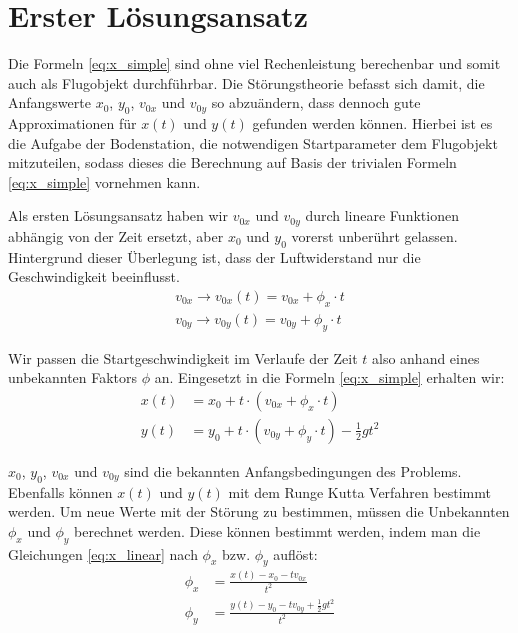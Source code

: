 \section{Erster Lösungsansatz
\label{perturbation:section:ersterloesungsansatz}}

Die Formeln \eqref{eq:x_simple} sind ohne viel Rechenleistung berechenbar und somit auch als Flugobjekt durchführbar. Die Störungstheorie befasst sich damit, die Anfangswerte $x_0$, $y_0$, $v_{0x}$ und $v_{0y}$ so abzuändern, dass dennoch gute Approximationen für $x(t)$ und $y(t)$ gefunden werden können. Hierbei ist es die Aufgabe der Bodenstation, die notwendigen Startparameter dem Flugobjekt mitzuteilen, sodass dieses die Berechnung auf Basis der trivialen Formeln \ref{eq:x_simple}  vornehmen kann.

Als ersten Lösungsansatz haben wir $v_{0x}$ und $v_{0y}$ durch lineare Funktionen abhängig von der Zeit ersetzt, aber $x_0$ und $y_0$ vorerst unberührt gelassen. Hintergrund dieser Überlegung ist, dass der Luftwiderstand nur die Geschwindigkeit beeinflusst.
\begin{equation*}
	\begin{aligned}
		v_{0x} \rightarrow v_{0x}(t) = v_{0x} + \phi_x \cdot t\\
		v_{0y} \rightarrow v_{0y}(t) = v_{0y} + \phi_y \cdot t
	\end{aligned}
\end{equation*}



Wir passen die Startgeschwindigkeit im Verlaufe der Zeit $t$ also anhand eines unbekannten Faktors $\phi$ an. Eingesetzt in die Formeln \eqref{eq:x_simple} erhalten wir:
\begin{equation}\label{eq:x_linear}
\begin{aligned}
    x(t) &= x_0 + t \cdot (v_{0x} + \phi_x \cdot t) \\
    y(t) &= y_0 + t \cdot (v_{0y} + \phi_y \cdot t) - \frac{1}{2}gt^2
\end{aligned}
\end{equation}

$x_0$, $y_0$, $v_{0x}$ und $v_{0y}$ sind die bekannten Anfangsbedingungen des Problems. Ebenfalls können $x(t)$ und $y(t)$ mit dem Runge Kutta Verfahren bestimmt werden. Um neue Werte mit der Störung zu bestimmen, müssen die Unbekannten $\phi_x$ und $\phi_y$ berechnet werden. Diese können bestimmt werden, indem man die Gleichungen \eqref{eq:x_linear} nach $\phi_x$ bzw. $\phi_y$ auflöst:
\begin{equation}
	\begin{aligned}
	\phi_x &= \frac{x(t) - x_0 - tv_{0x}}{t^2}\\
	\phi_y &= \frac{y(t) - y_0 - tv_{0y} + \frac{1}{2}gt^2}{t^2}
	\end{aligned}
\end{equation}

